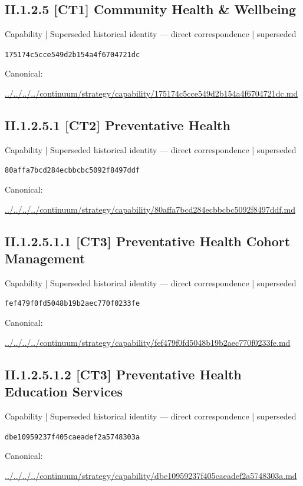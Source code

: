 \documentclass[10pt,a4paper]{article}
\begin{document}
\subsection*{II.1.2.5 [CT1] Community Health \& Wellbeing}
{\small Capability | Superseded historical identity — direct correspondence | superseded}\par
\texttt{175174c5cce549d2b154a4f6704721dc}\par
Canonical: \par
{\footnotesize\url{../../../../continuum/strategy/capability/175174c5cce549d2b154a4f6704721dc.md}}\par
\subsection*{II.1.2.5.1 [CT2] Preventative Health}
{\small Capability | Superseded historical identity — direct correspondence | superseded}\par
\texttt{80affa7bcd284ecbbcbc5092f8497ddf}\par
Canonical: \par
{\footnotesize\url{../../../../continuum/strategy/capability/80affa7bcd284ecbbcbc5092f8497ddf.md}}\par
\subsection*{II.1.2.5.1.1 [CT3] Preventative Health Cohort Management}
{\small Capability | Superseded historical identity — direct correspondence | superseded}\par
\texttt{fef479f0fd5048b19b2aec770f0233fe}\par
Canonical: \par
{\footnotesize\url{../../../../continuum/strategy/capability/fef479f0fd5048b19b2aec770f0233fe.md}}\par
\subsection*{II.1.2.5.1.2 [CT3] Preventative Health Education Services}
{\small Capability | Superseded historical identity — direct correspondence | superseded}\par
\texttt{dbe10959237f405caeadef2a5748303a}\par
Canonical: \par
{\footnotesize\url{../../../../continuum/strategy/capability/dbe10959237f405caeadef2a5748303a.md}}\par
\end{document}
